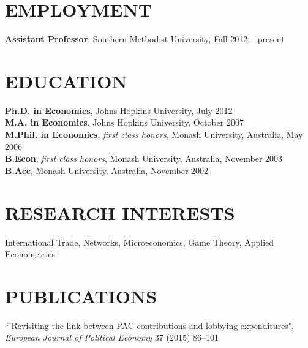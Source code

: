 \documentclass[11pt]{res}
\begin{document}
\begin{resume}
\hspace{-0.5in}\makebox[6.1in]{\hrulefill}

\section{EMPLOYMENT} \vspace{2mm}
{\bf Assistant Professor}, Southern Methodist University, Fall 2012 -- present

\section{EDUCATION} \vspace{2mm}
    {\bf Ph.D. in Economics}, Johns Hopkins University, July 2012 \vspace{.5mm}\\
    {\bf M.A. in Economics}, Johns Hopkins University, October 2007\vspace{1.5mm}\\
    {\bf M.Phil. in Economics}, \emph{first class honors}, Monash University, Australia, May 2006\vspace{1.5mm}\\
    {\bf B.Econ}, \emph{first class honors}, Monash University, Australia, November 2003\vspace{1.5mm}\\
    {\bf B.Acc}, Monash University, Australia, November 2002


\section{RESEARCH INTERESTS}\vspace{2mm}
International Trade, Networks, Microeconomics, Game Theory, Applied Econometrics

\section{PUBLICATIONS}\vspace{2mm}
{``'Revisiting the link between PAC contributions and lobbying expenditures", \emph{European Journal of Political Economy}} 37 (2015) 86--101 \vspace{1.5mm}


\end{resume}
\end{document}
